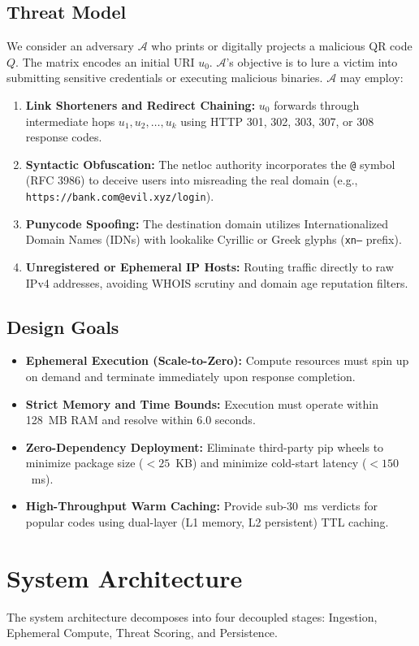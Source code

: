 \documentclass[10pt,conference,letterpaper]{IEEEtran}
\begin{document}
\subsection{Threat Model}
We consider an adversary $\mathcal{A}$ who prints or digitally projects a malicious QR code $Q$. The matrix encodes an initial URI $u_0$. $\mathcal{A}$'s objective is to lure a victim into submitting sensitive credentials or executing malicious binaries. $\mathcal{A}$ may employ:
\begin{enumerate}
    \item \textbf{Link Shorteners and Redirect Chaining:} $u_0$ forwards through intermediate hops $u_1, u_2, \dots, u_k$ using HTTP 301, 302, 303, 307, or 308 response codes.
    \item \textbf{Syntactic Obfuscation:} The netloc authority incorporates the \texttt{@} symbol (RFC 3986) to deceive users into misreading the real domain (e.g., \texttt{https://bank.com@evil.xyz/login}).
    \item \textbf{Punycode Spoofing:} The destination domain utilizes Internationalized Domain Names (IDNs) with lookalike Cyrillic or Greek glyphs (\texttt{xn--} prefix).
    \item \textbf{Unregistered or Ephemeral IP Hosts:} Routing traffic directly to raw IPv4 addresses, avoiding WHOIS scrutiny and domain age reputation filters.
\end{enumerate}

\subsection{Design Goals}
\begin{itemize}
    \item \textbf{Ephemeral Execution (Scale-to-Zero):} Compute resources must spin up on demand and terminate immediately upon response completion.
    \item \textbf{Strict Memory and Time Bounds:} Execution must operate within 128~MB RAM and resolve within 6.0 seconds.
    \item \textbf{Zero-Dependency Deployment:} Eliminate third-party pip wheels to minimize package size ($< 25$~KB) and minimize cold-start latency ($< 150$~ms).
    \item \textbf{High-Throughput Warm Caching:} Provide sub-30~ms verdicts for popular codes using dual-layer (L1 memory, L2 persistent) TTL caching.
\end{itemize}

\section{System Architecture}
The system architecture decomposes into four decoupled stages: Ingestion, Ephemeral Compute, Threat Scoring, and Persistence.
\end{document}
